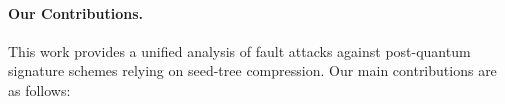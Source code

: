 \paragraph{Our Contributions.}
This work provides a unified analysis of fault attacks against
post-quantum signature schemes relying on seed-tree compression.
Our main contributions are as follows:
